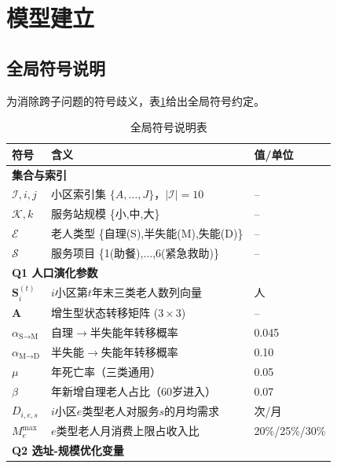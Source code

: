 
\section{模型建立}

\subsection{全局符号说明}

为消除跨子问题的符号歧义，表\ref{tab:notation}给出全局符号约定。

\begin{table}[htbp]
\centering
\caption{全局符号说明表}
\label{tab:notation}
\footnotesize
\renewcommand{\arraystretch}{0.92}
\begin{tabular}{lll}
\toprule
\textbf{符号} & \textbf{含义} & \textbf{值/单位} \\
\midrule
\multicolumn{3}{l}{\textbf{集合与索引}}\\
\midrule
$\mathcal{I},i,j$ & 小区索引集 $\{A,\dots,J\}$，$|\mathcal{I}|=10$ & -- \\
$\mathcal{K},k$ & 服务站规模 \{小,中,大\} & -- \\
$\mathcal{E}$ & 老人类型 \{自理(S),半失能(M),失能(D)\} & -- \\
$\mathcal{S}$ & 服务项目 \{1(助餐),$\dots$,6(紧急救助)\} & -- \\
\midrule
\multicolumn{3}{l}{\textbf{Q1 人口演化参数}}\\
\midrule
$\mathbf{S}_i^{(t)}$ & $i$小区第$t$年末三类老人数列向量 & 人 \\
$\mathbf{A}$ & 增生型状态转移矩阵 ($3\times 3$) & -- \\
$\alpha_{\text{S}\to\text{M}}$ & 自理$\to$半失能年转移概率 & 0.045 \\
$\alpha_{\text{M}\to\text{D}}$ & 半失能$\to$失能年转移概率 & 0.10 \\
$\mu$ & 年死亡率（三类通用） & 0.05 \\
$\beta$ & 年新增自理老人占比（60岁进入） & 0.07 \\
$D_{i,e,s}$ & $i$小区$e$类型老人对服务$s$的月均需求 & 次/月 \\
$M_e^{\max}$ & $e$类型老人月消费上限占收入比 & 20\%/25\%/30\% \\
\midrule
\multicolumn{3}{l}{\textbf{Q2 选址-规模优化变量}}\\

\end{tabular}
\end{table}
